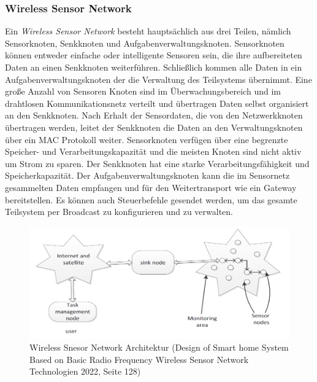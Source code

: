 \documentclass[a4paper,12pt]{scrartcl}
\begin{document}

\newpage
\subsubsection{Wireless Sensor Network}
Ein \textit{Wireless Sensor Network} besteht hauptsächlich aus drei Teilen, nämlich Sensorknoten, Senkknoten
und Aufgabenverwaltungsknoten.
Sensorknoten können entweder einfache oder intelligente Sensoren sein, die ihre aufbereiteten Daten an einen Senkknoten weiterführen. Schließlich kommen alle Daten in ein Aufgabenverwaltungsknoten der die Verwaltung des Teilsystems übernimmt.
Eine große Anzahl von Sensoren Knoten sind im Überwachungsbereich und im drahtlosen Kommunikationsnetz verteilt und übertragen Daten selbst organisiert an den Senkknoten. Nach Erhalt der Sensordaten, die von den Netzwerkknoten übertragen werden, leitet der Senkknoten die Daten an den
Verwaltungsknoten über ein MAC Protokoll weiter.
Sensorknoten verfügen über eine begrenzte Speicher- und Verarbeitungskapazität und die meisten Knoten sind nicht aktiv
um Strom zu sparen. Der Senkknoten
hat eine starke Verarbeitungsfähigkeit und Speicherkapazität. Der Aufgabenverwaltungsknoten kann die im Sensornetz gesammelten Daten empfangen und für den Weitertransport wie ein Gateway bereitstellen. Es können auch Steuerbefehle gesendet werden, um das gesamte Teilsystem per Broadcast zu konfigurieren und zu verwalten.\cite[Seite 128 ff]{FangTian.2018}
\vspace{0.5cm}
\begin{figure}[H]
\includegraphics[scale=0.85]{picture/WSN}
\caption{Wireless Snesor Network Architektur (Design of Smart home System Based on Basic Radio Frequency Wireless Sensor Network Technologien 2022, Seite 128)}
\label{fig:Wireless Snesor Network Architektur}
\end{figure}
\end{document}
